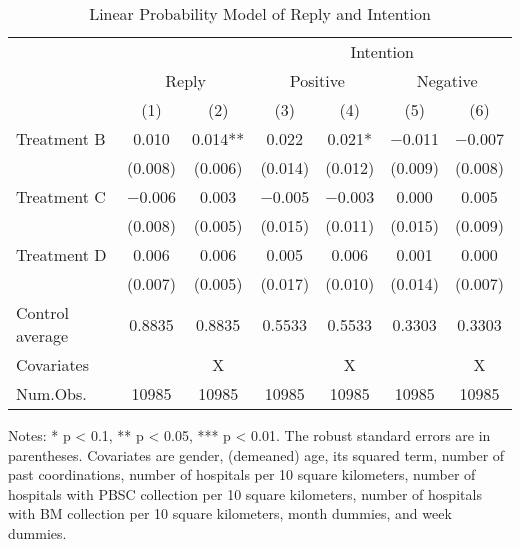 \documentclass[
  11pt,
  a4paper
]{article}
\begin{document}
\begin{table}

\caption{\label{tab:reg-stock}Linear Probability Model of Reply and Intention}
\centering
\fontsize{9}{11}\selectfont
\begin{threeparttable}
\begin{tabular}[t]{lcccccc}
\toprule
\multicolumn{3}{c}{ } & \multicolumn{4}{c}{Intention} \\
\cmidrule(l{3pt}r{3pt}){4-7}
\multicolumn{1}{c}{ } & \multicolumn{2}{c}{Reply} & \multicolumn{2}{c}{Positive} & \multicolumn{2}{c}{Negative} \\
\cmidrule(l{3pt}r{3pt}){2-3} \cmidrule(l{3pt}r{3pt}){4-5} \cmidrule(l{3pt}r{3pt}){6-7}
  & (1) & (2) & (3) & (4) & (5) & (6)\\
\midrule
Treatment B & \num{0.010} & \num{0.014}** & \num{0.022} & \num{0.021}* & \num{-0.011} & \num{-0.007}\\
 & (\num{0.008}) & (\num{0.006}) & (\num{0.014}) & (\num{0.012}) & (\num{0.009}) & (\num{0.008})\\
Treatment C & \num{-0.006} & \num{0.003} & \num{-0.005} & \num{-0.003} & \num{0.000} & \num{0.005}\\
 & (\num{0.008}) & (\num{0.005}) & (\num{0.015}) & (\num{0.011}) & (\num{0.015}) & (\num{0.009})\\
Treatment D & \num{0.006} & \num{0.006} & \num{0.005} & \num{0.006} & \num{0.001} & \num{0.000}\\
 & (\num{0.007}) & (\num{0.005}) & (\num{0.017}) & (\num{0.010}) & (\num{0.014}) & (\num{0.007})\\
\midrule
Control average & 0.8835 & 0.8835 & 0.5533 & 0.5533 & 0.3303 & 0.3303\\
Covariates &  & X &  & X &  & X\\
Num.Obs. & \num{10985} & \num{10985} & \num{10985} & \num{10985} & \num{10985} & \num{10985}\\
\bottomrule
\end{tabular}
\begin{tablenotes}
\item Notes: * p < 0.1, ** p < 0.05, *** p < 0.01. The robust standard errors are in parentheses. Covariates are gender, (demeaned) age, its squared term, number of past coordinations, number of hospitals per 10 square kilometers, number of hospitals with PBSC collection per 10 square kilometers, number of hospitals with BM collection per 10 square kilometers, month dummies, and week dummies.
\end{tablenotes}
\end{threeparttable}
\end{table}
\end{document}
